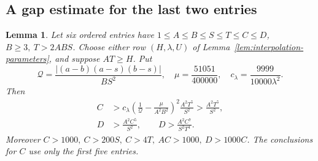 \documentclass[12pt]{article}
\newtheorem{lemma}[theorem]{Lemma}
\numberwithin{equation}{section}
\begin{document}
\subsection{A gap estimate for the last two entries}
\begin{lemma}\label{lem:retained-gap}
Let six ordered entries have \(1\le A\le B\le S\le T\le C\le D\),
\(B\ge3,\ T>2ABS\). Choose either row \((H,\lambda,U)\) of
Lemma~\ref{lem:interpolation-parameters}, and suppose \(AT\ge H\).
Put
\[
 \mathcal Q=\frac{|(a-b)(a-s)(b-s)|}{BS^2},\quad
 \mu=\frac{51051}{400000},\quad c_\lambda=\frac{9999}{10000\lambda^2}.
\]
Then
\begin{align}
 C&>c_\lambda\left(\frac1{\mathcal Q}-\frac{\mu}{A^2B^2}\right)^2
                     \frac{A^2T^5}{S^2}
   >\frac{A^2T^5}{S^2},                                      \label{eq:retained-main}\\
 D&>\frac{A^2C^5}{S^2},\qquad
 D>\frac{A^2C^7}{S^2T^4}.                                    \label{eq:retained-start}
\end{align}
Moreover \(C>1000,\ C>200S,\ C>4T,\ AC>1000,\ D>1000C\).
The conclusions for \(C\) use only the first five entries.
\end{lemma}
\end{document}
